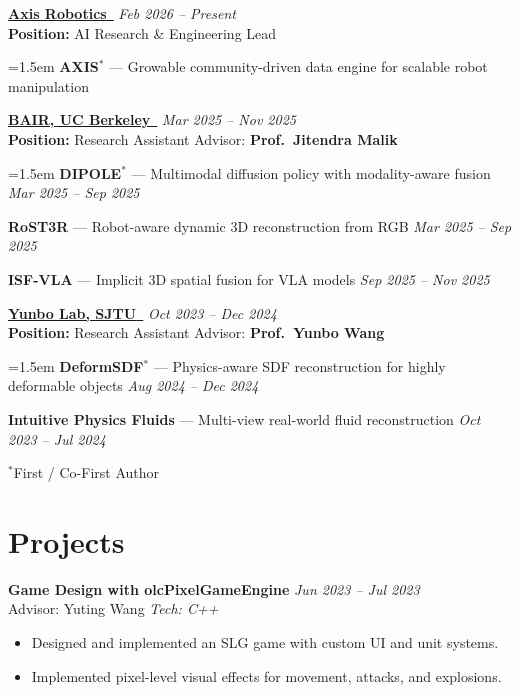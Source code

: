 \documentclass{chicv}
\begin{document}
\href{https://axisrobotics.ai}{\textbf{Axis Robotics}\ {\scalebox{0.6}{\faExternalLink*}}} \hfill \textit{Feb 2026 -- Present} \\
\textbf{Position:} AI Research \& Engineering Lead

{\leftskip=1.5em
\textbf{AXIS$^{\ast}$} — Growable community-driven data engine for scalable robot manipulation \par
}

\href{https://bair.berkeley.edu}{\textbf{BAIR, UC Berkeley}\ {\scalebox{0.6}{\faExternalLink*}}} \hfill \textit{Mar 2025 -- Nov 2025} \\
\textbf{Position:} Research Assistant \hfill Advisor: \textbf{Prof.\ Jitendra Malik}

{\leftskip=1.5em
\textbf{DIPOLE$^{\ast}$} — Multimodal diffusion policy with modality-aware fusion \hfill \textit{Mar 2025 -- Sep 2025} \par
\textbf{RoST3R} — Robot-aware dynamic 3D reconstruction from RGB \hfill \textit{Mar 2025 -- Sep 2025} \par
\textbf{ISF-VLA} — Implicit 3D spatial fusion for VLA models \hfill \textit{Sep 2025 -- Nov 2025} \par
}

\href{https://wyb15.github.io}{\textbf{Yunbo Lab, SJTU}\ {\scalebox{0.6}{\faExternalLink*}}} \hfill \textit{Oct 2023 -- Dec 2024} \\
\textbf{Position:} Research Assistant \hfill Advisor: \textbf{Prof.\ Yunbo Wang}

{\leftskip=1.5em
\textbf{DeformSDF$^{\ast}$} — Physics-aware SDF reconstruction for highly deformable objects \hfill \textit{Aug 2024 -- Dec 2024} \par
\textbf{Intuitive Physics Fluids} — Multi-view real-world fluid reconstruction \hfill \textit{Oct 2023 -- Jul 2024} \par
}

{\footnotesize $^{\ast}$First / Co-First Author}
\section*{Projects}

\textbf{Game Design with olcPixelGameEngine} \hfill \textit{Jun 2023 -- Jul 2023} \\
Advisor: Yuting Wang \hfill \textit{Tech: C++}
\begin{itemize}[noitemsep, topsep=0pt]
    \item Designed and implemented an SLG game with custom UI and unit systems.
    \item Implemented pixel-level visual effects for movement, attacks, and explosions.
\end{itemize}
\end{document}
